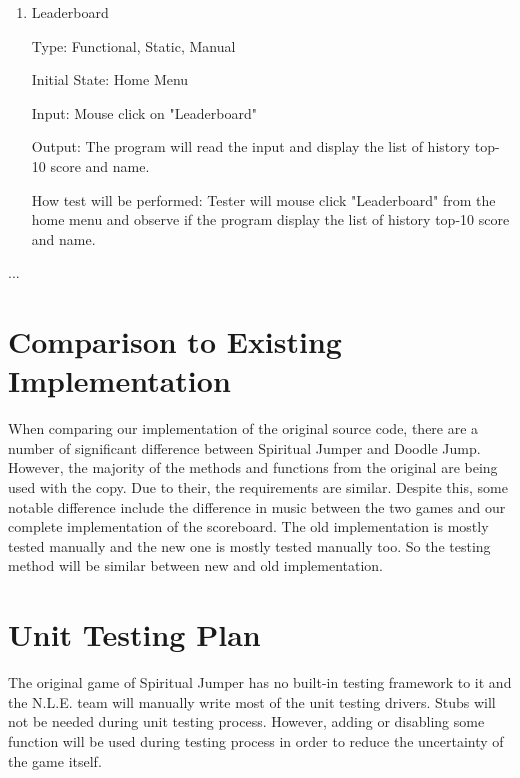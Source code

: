 \documentclass[12pt, titlepage]{article}
\newcommand{\rev}[1]{\textcolor{RevisionColour}{#1}}
\begin{document}
\begin{enumerate}

\item{Leaderboard\\}

Type: Functional, Static, Manual
					
Initial State: Home Menu
					
Input: Mouse click on "Leaderboard"
					
Output: The program will read the input and display the list of history top-10 score and name.
					
How test will be performed: Tester will mouse click "Leaderboard" from the home menu and observe if the program display the list of history top-10 score and name.

\end{enumerate}
...

	
\section{Comparison to Existing Implementation}	

When comparing our implementation of the original source code, there are a number of significant difference between Spiritual Jumper and Doodle Jump. However, the majority of the methods and functions from the original are being used with the copy. Due to their, the requirements are similar. Despite this, some notable difference include the difference in music between the two games and our complete implementation of the scoreboard. 
\rev{The old implementation is mostly tested manually and the new one is mostly tested manually too.  So the testing method will be similar between new and old implementation.}
				
\section{Unit Testing Plan}
The original game of Spiritual Jumper has no built-in testing framework to it and the N.L.E. team will manually write most of the unit testing drivers. Stubs will not be needed during unit testing process. However, adding or disabling some function will be used during testing process in order to reduce the uncertainty of the game itself.
\end{document}
